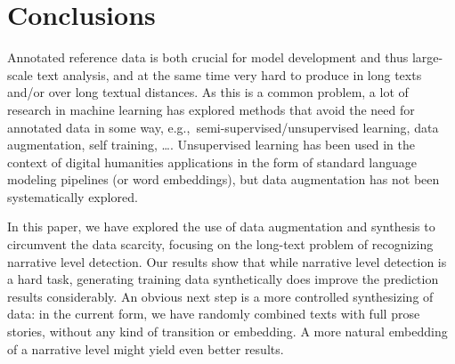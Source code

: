 \documentclass[10pt, a4paper]{article}
\newcommand{\sina}[1]{\textit{\textcolor{blue}{sina: #1}}}
\begin{document}








\section{Conclusions}
\label{sec:conclusions}

Annotated reference data is both crucial for model development and thus large-scale text analysis, and at the same time very hard to produce in long texts and/or over long textual distances. As this is a common problem, a lot of research in machine learning has explored methods that avoid the need for annotated data in some way, e.g.,~semi-supervised/unsupervised learning, data augmentation, self training, \dots. Unsupervised learning has been used in the context of digital humanities applications in the form of standard language modeling pipelines (or word embeddings), but data augmentation has not been systematically explored. 

In this paper, we have explored the use of data augmentation and synthesis to circumvent the data scarcity, focusing on the long-text problem of recognizing narrative level detection. Our results show that while narrative level detection is a hard task, generating training data synthetically does improve the prediction results considerably. An obvious next step is a more controlled synthesizing of data: in the current form, we have randomly combined texts with full prose stories, without any kind of transition or embedding. A more natural embedding of a narrative level might yield even better results.
\end{document}
